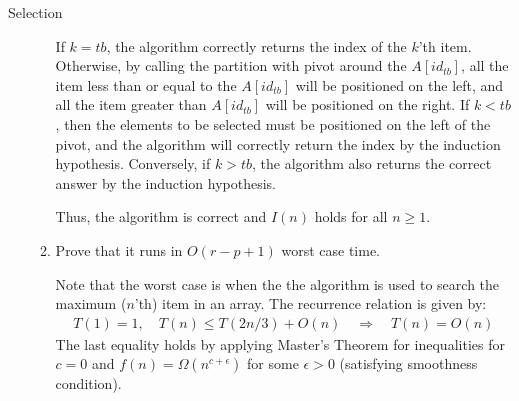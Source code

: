 \documentclass{article}
\begin{document}
\begin{section}{Selection}
\begin{enumerate}
\begin{enumerate}
        If $k = tb$, the algorithm correctly returns the index of the $k$'th item. Otherwise, by calling the partition with pivot around the $A[id_{tb}]$, all the item less than or equal to the $A[id_{tb}]$ will be positioned on the left, and all the item greater than $A[id_{tb}]$ will be positioned on the right. If $k < tb$, then the elements to be selected must be positioned on the left of the pivot, and the algorithm will correctly return the index by the induction hypothesis. Conversely, if $k > tb$, the algorithm also returns the correct answer by the induction hypothesis. 
        
        Thus, the algorithm is correct and $I(n)$ holds for all $n \geq 1$.
        
        \item Prove that it runs in $O(r - p + 1)$ worst case time.
        
        Note that the worst case is when the the algorithm is used to search the maximum ($n$'th) item in an array. The recurrence relation is given by:
        \begin{align*}
            T(1) = 1, \quad T(n) \leq T(2n/3) + O(n) \quad \Rightarrow{} \quad \boxed{T(n) = O(n)}
        \end{align*}
        The last equality holds by applying Master's Theorem for inequalities for $c = 0$ and $f(n) = \Omega(n^{c+\epsilon})$ for some $\epsilon > 0$ (satisfying smoothness condition).
    \end{enumerate}
\end{enumerate}
\end{section}
\newpage
\end{document}
